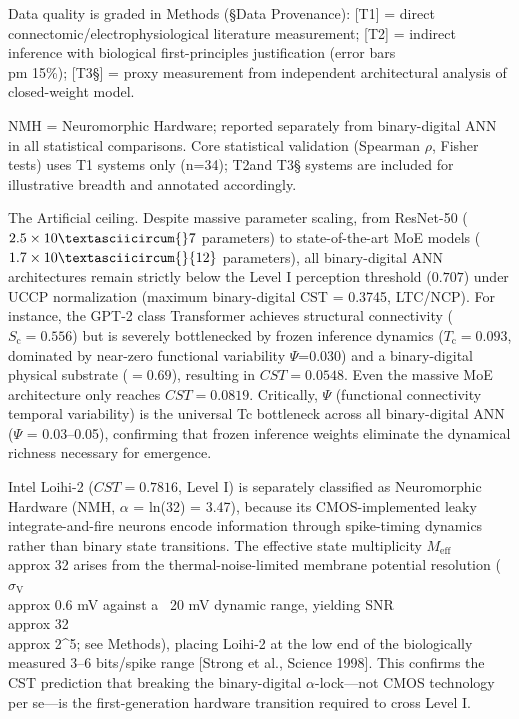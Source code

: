 \documentclass[a4paper,12pt]{article}
\begin{document}
Data quality is graded in Methods (\S{}Data Provenance): [T1] = direct connectomic/electrophysiological literature measurement; [T2\dag] = indirect inference with biological first-principles justification (error bars  \\pm 15\%); [T3\S{}] = proxy measurement from independent architectural analysis of closed-weight model.


\dag{}NMH = Neuromorphic Hardware; reported separately from binary-digital ANN in all statistical comparisons. Core statistical validation (Spearman $\rho$, Fisher tests) uses T1 systems only (n=34); T2\dag and T3\S{} systems are included for illustrative breadth and annotated accordingly.


The Artificial ceiling. Despite massive parameter scaling, from ResNet-50 ($2.5 \times 10\textasciicircum{}7$ parameters) to state-of-the-art MoE models ($1.7 \times 10\textasciicircum{}{12}$ parameters), all binary-digital ANN architectures remain strictly below the Level I perception threshold ($0.707$) under UCCP normalization (maximum binary-digital CST = 0.3745, LTC/NCP). For instance, the GPT-2 class Transformer achieves structural connectivity ($S_{\text{c}}=0.556$) but is severely bottlenecked by frozen inference dynamics ($T_{\text{c}}=0.093$, dominated by near-zero functional variability $\Psi$=0.030) and a binary-digital physical substrate (\alpha$=0.69$), resulting in $CST = 0.0548$. Even the massive MoE architecture only reaches $CST = 0.0819$. Critically, $\Psi$ (functional connectivity temporal variability) is the universal Tc bottleneck across all binary-digital ANN ($\Psi$ = 0.03--0.05), confirming that frozen inference weights eliminate the dynamical richness necessary for emergence.


Intel Loihi-2 ($CST = 0.7816$, Level I) is separately classified as Neuromorphic Hardware (NMH, $\alpha$ = ln(32) = 3.47), because its CMOS-implemented leaky integrate-and-fire neurons encode information through spike-timing dynamics rather than binary state transitions. The effective state multiplicity $M_{\text{eff}}$  \\approx  32 arises from the thermal-noise-limited membrane potential resolution ($\sigma_{\text{V}}$  \\approx  0.6 mV against a ~20 mV dynamic range, yielding SNR  \\approx  32  \\approx  2^5; see Methods), placing Loihi-2 at the low end of the biologically measured 3--6 bits/spike range [Strong et al., Science 1998]. This confirms the CST prediction that breaking the binary-digital $\alpha$-lock---not CMOS technology per se---is the first-generation hardware transition required to cross Level I.
\end{document}
